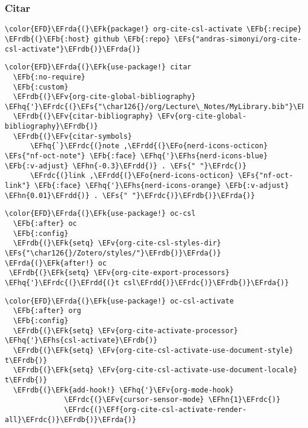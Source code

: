 \documentclass[12pt]{article}
\theoremstyle{plain}%
\theoremstyle{definition}
\theoremstyle{remark}
\newcommand{\EFs}[1]{\textcolor{EFs}{#1}} %
\newcommand{\EFk}[1]{\textcolor{EFk}{#1}} %
\newcommand{\EFb}[1]{\textcolor{EFb}{#1}} %
\newcommand{\EFf}[1]{\textcolor{EFf}{#1}} %
\newcommand{\EFv}[1]{\textcolor{EFv}{#1}} %
\newcommand{\EFo}[1]{\textcolor{EFo}{#1}} %
\newcommand{\EFhn}[1]{\textcolor{EFhn}{\textbf{#1}}} %
\newcommand{\EFhq}[1]{\textcolor{EFhq}{#1}} %
\newcommand{\EFhs}[1]{\textcolor{EFhs}{#1}} %
\newcommand{\EFrda}[1]{\textcolor{EFrda}{#1}} %
\newcommand{\EFrdb}[1]{\textcolor{EFrdb}{#1}} %
\newcommand{\EFrdc}[1]{\textcolor{EFrdc}{#1}} %
\newcommand{\EFrdd}[1]{\textcolor{EFrdd}{#1}} %
\begin{document}
\subsubsection{Citar}
\label{sec:org9f57749}
\begin{Code}
\begin{Verbatim}
\color{EFD}\EFrda{(}\EFk{package!} org-cite-csl-activate \EFb{:recipe} \EFrdb{(}\EFb{:host} github \EFb{:repo} \EFs{"andras-simonyi/org-cite-csl-activate"}\EFrdb{)}\EFrda{)}
\end{Verbatim}
\end{Code}
\begin{Code}
\begin{Verbatim}
\color{EFD}\EFrda{(}\EFk{use-package!} citar
  \EFb{:no-require}
  \EFb{:custom}
  \EFrdb{(}\EFv{org-cite-global-bibliography} \EFhq{'}\EFrdc{(}\EFs{"\char126{}/org/Lecture\_Notes/MyLibrary.bib"}\EFrdc{)}\EFrdb{)}
  \EFrdb{(}\EFv{citar-bibliography} \EFv{org-cite-global-bibliography}\EFrdb{)}
  \EFrdb{(}\EFv{citar-symbols}
      \EFhq{`}\EFrdc{(}note ,\EFrdd{(}\EFo{nerd-icons-octicon} \EFs{"nf-oct-note"} \EFb{:face} \EFhq{'}\EFhs{nerd-icons-blue} \EFb{:v-adjust} \EFhn{-0.3}\EFrdd{)} . \EFs{" "}\EFrdc{)}
      \EFrdc{(}link ,\EFrdd{(}\EFo{nerd-icons-octicon} \EFs{"nf-oct-link"} \EFb{:face} \EFhq{'}\EFhs{nerd-icons-orange} \EFb{:v-adjust} \EFhn{0.01}\EFrdd{)} . \EFs{" "}\EFrdc{)}\EFrdb{)}\EFrda{)}

\end{Verbatim}
\end{Code}
\begin{Code}
\begin{Verbatim}
\color{EFD}\EFrda{(}\EFk{use-package!} oc-csl
  \EFb{:after} oc
  \EFb{:config}
  \EFrdb{(}\EFk{setq} \EFv{org-cite-csl-styles-dir} \EFs{"\char126{}/Zotero/styles/"}\EFrdb{)}\EFrda{)}
\EFrda{(}\EFk{after!} oc
 \EFrdb{(}\EFk{setq} \EFv{org-cite-export-processors} \EFhq{'}\EFrdc{(}\EFrdd{(}t csl\EFrdd{)}\EFrdc{)}\EFrdb{)}\EFrda{)}

\end{Verbatim}
\end{Code}
\begin{Code}
\begin{Verbatim}
\color{EFD}\EFrda{(}\EFk{use-package!} oc-csl-activate
  \EFb{:after} org
  \EFb{:config}
  \EFrdb{(}\EFk{setq} \EFv{org-cite-activate-processor} \EFhq{'}\EFhs{csl-activate}\EFrdb{)}
  \EFrdb{(}\EFk{setq} \EFv{org-cite-csl-activate-use-document-style} t\EFrdb{)}
  \EFrdb{(}\EFk{setq} \EFv{org-cite-csl-activate-use-document-locale} t\EFrdb{)}
  \EFrdb{(}\EFk{add-hook!} \EFhq{'}\EFv{org-mode-hook}
              \EFrdc{(}\EFv{cursor-sensor-mode} \EFhn{1}\EFrdc{)}
              \EFrdc{(}\EFf{org-cite-csl-activate-render-all}\EFrdc{)}\EFrdb{)}\EFrda{)}

\end{Verbatim}
\end{Code}
\end{document}
